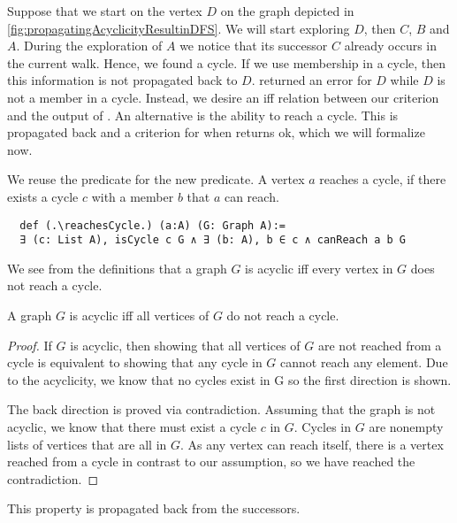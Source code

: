 \begin{example}
  \label{ex:propagatingAcyclicityResultinDFS}
  

  Suppose that we start \dfsstep on the vertex $D$ on the graph depicted in \cref{fig:propagatingAcyclicityResultinDFS}. We will start exploring $D$, then $C$, $B$ and $A$. During the exploration of $A$ we notice that its successor $C$ already occurs in the current walk. Hence, we found a cycle. If we use membership in a cycle, then this information is not propagated back to $D$. \dfsstep returned an error for $D$ while $D$ is not a member in a cycle. Instead, we desire an iff relation between our criterion and the output of \dfsstep. An alternative is the ability to reach a cycle. This is propagated back and a criterion for when \dfsstep returns ok, which we will formalize now.
\end{example}

We reuse the \canReach predicate for the new \reachesCycle predicate. A vertex $a$ reaches a cycle, if there exists a cycle $c$ with a member $b$ that $a$ can reach.

\begin{lstlisting}
  def (.\reachesCycle.) (a:A) (G: Graph A):= 
  ∃ (c: List A), isCycle c G ∧ ∃ (b: A), b ∈ c ∧ canReach a b G
\end{lstlisting}

We see from the definitions that a graph $G$ is acyclic iff every vertex in $G$ does not reach a cycle. 


\begin{lemma}[\acyclicIffAllNotReachCycle]\label{lem:acyclicIffAllNotReachCycle}
  A graph $G$ is acyclic iff all vertices of $G$ do not reach a cycle.
\end{lemma}
\begin{proof}
  If $G$ is acyclic, then showing that all vertices of $G$ are not reached from a cycle is equivalent to showing that any cycle in $G$ cannot reach any element. Due to the acyclicity, we know that no cycles exist in G so the first direction is shown.

  The back direction is proved via contradiction. Assuming that the graph is not acyclic, we know that there must exist a cycle $c$ in $G$. Cycles in $G$ are nonempty lists of vertices that are all in $G$. As any vertex can reach itself, there is a vertex reached from a cycle in contrast to our assumption, so we have reached the contradiction.
\end{proof}

This property is propagated back from the successors.

